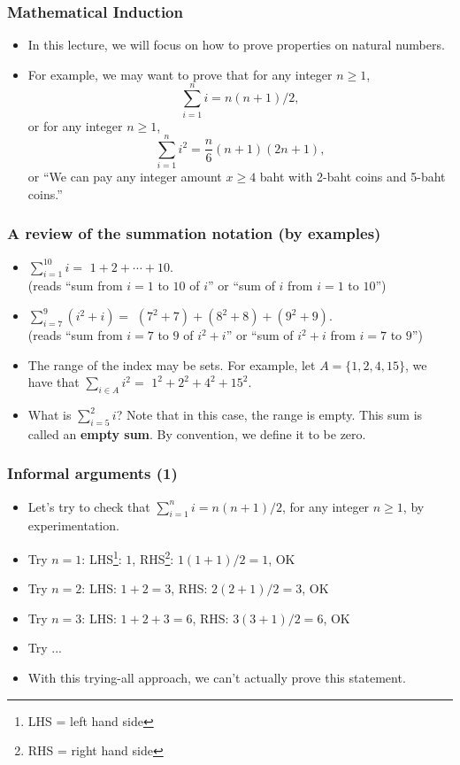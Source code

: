 

\begin{frame}\frametitle{Mathematical Induction}
  \begin{itemize}
  \item In this lecture, we will focus on how to prove properties on natural numbers. \pause
  \item For example, we may want to prove that for any integer $n\geq 1$,
    \[ \sum_{i=1}^n i = n(n+1)/2, \]
    \pause
    or for any integer $n\geq 1$,
    \[ \sum_{i=1}^n i^2 = \frac{n}{6}(n+1)(2n+1),\]
    \pause
    or ``We can pay any integer amount $x\geq 4$ baht with 2-baht
    coins and 5-baht coins.''
  \end{itemize}
\end{frame}

\begin{frame}\frametitle{A review of the summation notation (by examples)}
  \begin{itemize}
  \item $\displaystyle\sum_{i=1}^{10} i =$ \pause $1+2+\cdots+10.$ \\ \pause (reads ``sum from
    $i=1$ to $10$ of $i$'' or ``sum of $i$ from $i=1$ to $10$'') \pause
  \item $\displaystyle\sum_{i=7}^{9} (i^2+i) =$ \pause $(7^2+7)+(8^2+8)+(9^2+9).$ \\ \pause (reads ``sum from $i=7$ to $9$ of $i^2 + i$'' or ``sum of $i^2+i$ from $i=7$ to $9$'') \pause
  \item The range of the index may be sets.  For example, let
    $A=\{1,2,4,15\}$, we have that $\displaystyle\sum_{i\in A} i^2 =$ \pause $1^2+2^2+4^2+15^2$.
    \pause
  \item What is $\sum_{i=5}^{2} i$? \pause Note that in this case, the
    range is empty.  This sum is called an {\bf empty sum}.  By
    convention, we define it to be zero.
  \end{itemize}
\end{frame}

\begin{frame}\frametitle{Informal arguments (1)}
  \begin{itemize}
  \item Let's try to check that $\sum_{i=1}^n i = n(n+1)/2$, for any
    integer $n\geq 1$, by experimentation.
  \item Try $n=1$: \pause LHS\footnote{LHS = left hand side}: $1$, \pause RHS\footnote{RHS = right hand side}: $1(1+1)/2 = 1$, \pause OK
  \item Try $n=2$: \pause LHS: $1+2=3$, \pause RHS: $2(2+1)/2 = 3$, \pause OK
  \item Try $n=3$: \pause LHS: $1+2+3=6$, \pause RHS: $3(3+1)/2 = 6$, \pause OK
  \item Try ... \pause
  \item With this trying-all approach, we can't actually prove this statement.
  \end{itemize}
\end{frame}

